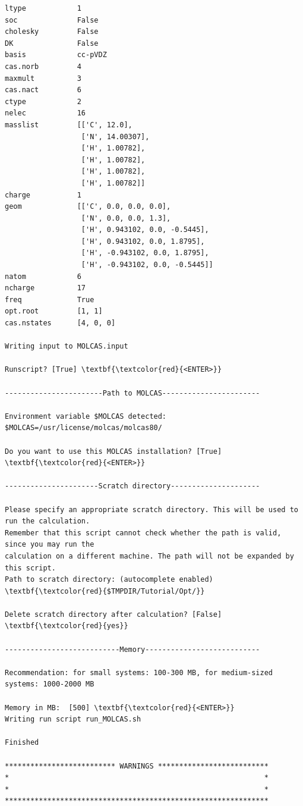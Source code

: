 \documentclass[a4paper,11pt,DIV=15,openany]{scrbook}
\begin{document}
\begin{oframed}
\begin{Verbatim}[commandchars=\\\{\}]
ltype            1
soc              False
cholesky         False
DK               False
basis            cc-pVDZ
cas.norb         4
maxmult          3
cas.nact         6
ctype            2
nelec            16
masslist         [['C', 12.0], 
                  ['N', 14.00307], 
                  ['H', 1.00782], 
                  ['H', 1.00782], 
                  ['H', 1.00782], 
                  ['H', 1.00782]]
charge           1
geom             [['C', 0.0, 0.0, 0.0], 
                  ['N', 0.0, 0.0, 1.3], 
                  ['H', 0.943102, 0.0, -0.5445], 
                  ['H', 0.943102, 0.0, 1.8795], 
                  ['H', -0.943102, 0.0, 1.8795], 
                  ['H', -0.943102, 0.0, -0.5445]]
natom            6
ncharge          17
freq             True
opt.root         [1, 1]
cas.nstates      [4, 0, 0]

Writing input to MOLCAS.input

Runscript? [True] \textbf{\textcolor{red}{<ENTER>}}

-----------------------Path to MOLCAS-----------------------

Environment variable $MOLCAS detected:
$MOLCAS=/usr/license/molcas/molcas80/

Do you want to use this MOLCAS installation? [True] \textbf{\textcolor{red}{<ENTER>}}

----------------------Scratch directory---------------------

Please specify an appropriate scratch directory. This will be used to run the calculation. 
Remember that this script cannot check whether the path is valid, since you may run the 
calculation on a different machine. The path will not be expanded by this script.
Path to scratch directory: (autocomplete enabled) \textbf{\textcolor{red}{$TMPDIR/Tutorial/Opt/}}

Delete scratch directory after calculation? [False] \textbf{\textcolor{red}{yes}}

---------------------------Memory---------------------------

Recommendation: for small systems: 100-300 MB, for medium-sized systems: 1000-2000 MB

Memory in MB:  [500] \textbf{\textcolor{red}{<ENTER>}}
Writing run script run_MOLCAS.sh

Finished

************************** WARNINGS **************************
*                                                            *
*                                                            *
**************************************************************
\end{Verbatim}
\end{oframed}
\end{document}
